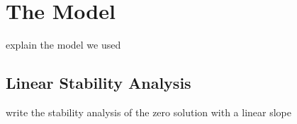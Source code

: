 \section{The Model}
explain the model we used
\subsection{Linear Stability Analysis}
write the stability analysis of the zero solution with a linear slope